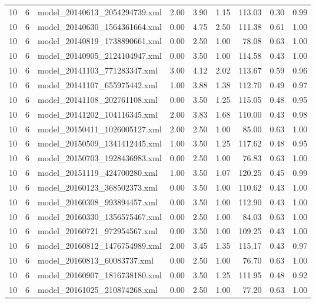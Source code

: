 \begin{table}[ht]
\begin{tabular}{rrlrrrrrr}
   10 &   6 & model\_20140613\_2054294739.xml & 2.00 & 3.90 & 1.15 & 113.03 & 0.30 & 0.99 \\ 
   10 &   6 & model\_20140630\_1564361664.xml & 0.00 & 4.75 & 2.50 & 111.38 & 0.61 & 1.00 \\ 
   10 &   6 & model\_20140819\_1738890661.xml & 0.00 & 2.50 & 1.00 & 78.08 & 0.63 & 1.00 \\ 
   10 &   6 & model\_20140905\_2124104947.xml & 0.00 & 3.50 & 1.00 & 114.58 & 0.43 & 1.00 \\ 
   10 &   6 & model\_20141103\_771283347.xml & 3.00 & 4.12 & 2.02 & 113.67 & 0.59 & 0.96 \\ 
   10 &   6 & model\_20141107\_655975442.xml & 1.00 & 3.88 & 1.38 & 112.70 & 0.49 & 0.97 \\ 
   10 &   6 & model\_20141108\_202761108.xml & 0.00 & 3.50 & 1.25 & 115.05 & 0.48 & 0.95 \\ 
   10 &   6 & model\_20141202\_104116345.xml & 2.00 & 3.83 & 1.68 & 110.00 & 0.43 & 0.98 \\ 
   10 &   6 & model\_20150411\_1026005127.xml & 2.00 & 2.50 & 1.00 & 85.00 & 0.63 & 1.00 \\ 
   10 &   6 & model\_20150509\_1341412445.xml & 1.00 & 3.50 & 1.25 & 117.62 & 0.48 & 0.95 \\ 
   10 &   6 & model\_20150703\_1928436983.xml & 0.00 & 2.50 & 1.00 & 76.83 & 0.63 & 1.00 \\ 
   10 &   6 & model\_20151119\_424700280.xml & 1.00 & 3.50 & 1.07 & 120.25 & 0.45 & 0.99 \\ 
   10 &   6 & model\_20160123\_368502373.xml & 0.00 & 3.50 & 1.00 & 110.62 & 0.43 & 1.00 \\ 
   10 &   6 & model\_20160308\_993894457.xml & 0.00 & 3.50 & 1.00 & 112.90 & 0.43 & 1.00 \\ 
   10 &   6 & model\_20160330\_1356575467.xml & 0.00 & 2.50 & 1.00 & 84.03 & 0.63 & 1.00 \\ 
   10 &   6 & model\_20160721\_972954567.xml & 0.00 & 3.50 & 1.00 & 109.25 & 0.43 & 1.00 \\ 
   10 &   6 & model\_20160812\_1476754989.xml & 2.00 & 3.45 & 1.35 & 115.17 & 0.43 & 0.97 \\ 
   10 &   6 & model\_20160813\_60083737.xml & 0.00 & 2.50 & 1.00 & 76.70 & 0.63 & 1.00 \\ 
   10 &   6 & model\_20160907\_1816738180.xml & 0.00 & 3.50 & 1.25 & 111.95 & 0.48 & 0.92 \\ 
   10 &   6 & model\_20161025\_210874268.xml & 0.00 & 2.50 & 1.00 & 77.20 & 0.63 & 1.00 \\ 

\end{tabular}
\end{table}
